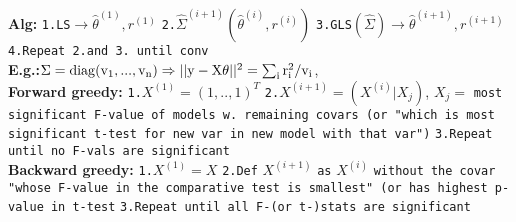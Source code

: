 \documentclass[11pt]{article}
\begin{document}
\begin{multicols}{4}
\textbf{Alg:} \texttt{1.LS}$\rightarrow\hat{\theta}^{(1)},r^{(1)}$ \texttt{2.}$\hat{\Sigma}^{(i+1)}(\hat{\theta}^{(i)},r^{(i)})$ \texttt{3.GLS}$(\hat{\Sigma})\rightarrow\hat{\theta}^{(i+1)},r^{(i+1)}$ \texttt{4.Repeat 2.and 3. until conv}\\

\textbf{E.g.:}$\Sigma=\rm{diag}(v_1,...,v_n)\Rightarrow ||y-X\theta||^2=\sum_i r_i^2/v_i$,
\\

\textbf{Forward greedy:} \texttt{1.}$X^{(1)}=(1,..,1)^T$ \texttt{2.}$X^{(i+1)}=(X^{(i)}|X_j)$, $X_j=$ \texttt{most significant F-value of models w. remaining covars (or "which is most significant t-test for new var in new model with that var")} \texttt{3.Repeat until no F-vals are significant}\\

\textbf{Backward greedy:} \texttt{1.}$X^{(1)}=X$ \texttt{2.Def} $X^{(i+1)}$ \texttt{as} $X^{(i)}$ \texttt{without the covar "whose F-value in the comparative test is smallest" (or has highest p-value in t-test} \texttt{3.Repeat until all F-(or t-)stats are significant}\\


\end{multicols}
\end{document}
